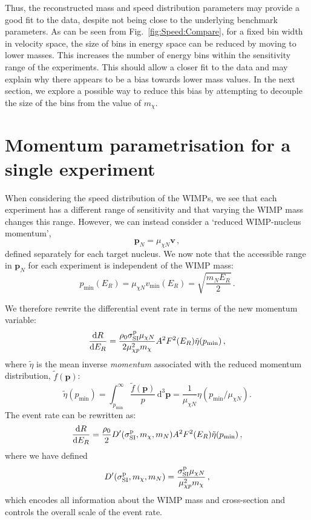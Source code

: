 Thus, the reconstructed mass and speed distribution parameters may provide a good fit to the data, despite not being close to the underlying benchmark parameters. As can be seen from Fig.\ \ref{fig:Speed:Compare}, for a fixed bin width in velocity space, the size of bins in energy space can be reduced by moving to lower masses. This increases the number of energy bins within the sensitivity range of the experiments. This should allow a closer fit to the data and may explain why there appears to be a bias towards lower mass values. In the next section, we explore a possible way to reduce this bias by attempting to decouple the size of the bins from the value of $m_\chi$.


\section{Momentum parametrisation for a single experiment}
\label{sec:Speed:MomentumMethod1}


When considering the speed distribution of the WIMPs, we see that each experiment has a different range of sensitivity and that varying the WIMP mass changes this range. However, we can instead consider a `reduced WIMP-nucleus momentum',
\begin{equation}
\textbf{p}_N = \mu_{\chi N} \textbf{v} \,,
\end{equation}
defined separately for each target nucleus. We now note that the accessible range in \(\textbf{p}_N\) for each experiment is independent of the WIMP mass:
\begin{equation}
p_\textrm{min}(E_R) = \mu_{\chi N} v_\textrm{min}(E_R) = \sqrt{\frac{m_N E_R}{2}} \,.
\end{equation}

We therefore rewrite the differential event rate in terms of the new momentum variable:
\begin{equation}
\frac{\textrm{d}R}{\textrm{d}E_R} = \frac{\rho_0 \sigmapsi \mu_{\chi N}}{2 \mu_{\chi p}^2 m_\chi} A^2 F^2(E_R) \tilde{\eta}(p_{\textrm{min}})\,,
\end{equation}
where \(\tilde{\eta}\) is the mean inverse \textit{momentum} associated with the reduced momentum distribution, \(\tilde{f}(\textbf{p})\):
\begin{equation}
\tilde{\eta}(p_{\textrm{min}}) = \int_{p_{\textrm{min}}}^\infty \frac{\tilde{f}(\textbf{p})}{p}\, \textrm{d}^3\textbf{p} = \frac{1}{\mu_{\chi N}}\eta(p_\textrm{min}/\mu_{\chi N}).
\end{equation}
The event rate can be rewritten as:
\begin{equation}
\frac{\textrm{d}R}{\textrm{d}E_R} = \frac{\rho_0}{2} D'(\sigmapsi,m_\chi,m_N) A^2 F^2(E_R) \tilde{\eta}(p_{\textrm{min}}) \,,
\end{equation}
where we have defined
\begin{equation}
D'(\sigmapsi,m_\chi,m_N) = \frac{\sigmapsi \mu_{\chi N}}{\mu_{\chi p}^2 m_\chi} \,,
\end{equation}
which encodes all information about the WIMP mass and cross-section and controls the overall scale of the event rate.

